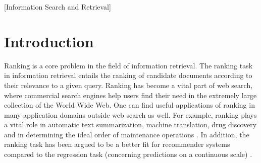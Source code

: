 \documentclass{sig-alternate}
\begin{document}
\maketitle
\begin{abstract}
Learning to rank is an increasingly important scientific field that comprises the use of machine learning for the ranking task. New learning to rank methods are generally evaluated on benchmark test collections. However, comparison of learning to rank methods based on evaluation results is hindered by non-existence of a \emph{de facto} standard set of evaluation benchmark collections. In this paper we propose a way to compare learning to rank methods based on a sparse set of evaluation results on a set of benchmark datasets. Our comparison methodology consists of two components: 1) Normalized Winning Number, which gives insight in the ranking accuracy of the learning to rank method, and 2) Ideal Winning Number, which gives insight in the degree of certainty concerning its ranking accuracy. Evaluation results of 87 learning to rank methods on 20 well-known benchmark datasets are collected through a structured literature search. ListNet, SmoothRank, FenchelRank, FSMRank, LRUF and LARF are the best performing learning to rank methods in increasing order of Normalized Winning Number and decreasing order of Ideal Winning Number.
\end{abstract}

[Information Search and Retrieval]


\section{Introduction}
Ranking is a core problem in the field of information retrieval. The ranking task in information retrieval entails the ranking of candidate documents according to their relevance to a given query. Ranking has become a vital part of web search, where commercial search engines help users find their need in the extremely large collection of the World Wide Web. One can find useful applications of ranking in many application domains outside web search as well. For example, ranking plays a vital role in automatic text summarization, machine translation, drug discovery and in determining the ideal order of maintenance operations \cite{Rudin2009}. In addition, the ranking task has been argued to be a better fit for recommender systems compared to the regression task (concerning predictions on a continuous scale) \cite{Adomavicius2005,McNee2006}.\\
\end{document}
